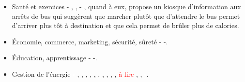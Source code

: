 \documentclass[10pt,a5paper,twoside]{article}
\begin{document}
\begin{itemize}
\itemsep1pt\parskip0pt
\item
  Santé et exercices - \citet{faber2011aulura}, \citet{kim2010inair},
  \citet{nakajima2008reflecting} - \citet{singh2007walkmsu}, quand à
  eux, propose un kiosque d'information aux arrêts de bus qui suggèrent
  que marcher plutôt que d'attendre le bus permet d'arriver plus tôt à
  destination et que cela permet de brûler plus de calories.
\item
  Économie, commerce, marketing, sécurité, sûreté -
  \citet{kalnikaite2011nudge} -.
\item
  Éducation, apprentissage - \citet{reis2011perception} -.
\item
  Gestion de l'énergie - \citet{belley2006semaphore},
  \citet{belley2006coupe}, \citet{evans2009artful},
  \citet{gustafsson2005power}, \citet{kyoto2005wattson},
  \citet{jonsson2010watt}, \citet{ernevi2005energy},
  \citet{gyllensward2006visualizing}, \citet{lagerkvist2016flower},
  \citet{lagerkvist2016disappearing}, \textcolor{red}{à lire}
  \citet{rogers2010ambient}, \citet{kuznetsov2010upstream},
  \citet{valkanova2013reveal} -.
\end{itemize}

\newpage


\end{document}
